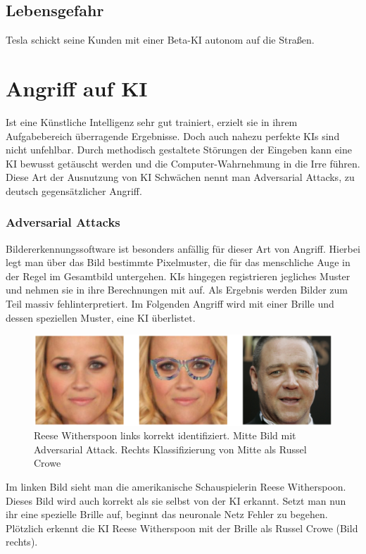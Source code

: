 \documentclass[12pt,oneside,a4paper,parskip]{scrbook}
\begin{document}
\subsection{Lebensgefahr}
Tesla schickt seine Kunden mit einer Beta-KI autonom auf die Straßen.
\section{Angriff auf KI}
Ist eine Künstliche Intelligenz sehr gut trainiert, erzielt sie in ihrem Aufgabebereich überragende Ergebnisse. Doch auch nahezu perfekte KIs sind nicht unfehlbar. Durch methodisch gestaltete Störungen der Eingeben kann eine KI bewusst getäuscht werden und die Computer-Wahrnehmung in die Irre führen. Diese Art der Ausnutzung von KI Schwächen nennt man Adversarial Attacks, zu deutsch gegensätzlicher Angriff.
\subsubsection{Adversarial Attacks}
Bildererkennungssoftware ist besonders anfällig für dieser Art von Angriff. Hierbei legt man über das Bild bestimmte Pixelmuster, die für das menschliche Auge in der Regel im Gesamtbild untergehen. KIs hingegen registrieren jegliches Muster und nehmen sie in ihre Berechnungen mit auf. Als Ergebnis werden Bilder zum Teil massiv fehlinterpretiert.
Im Folgenden Angriff wird mit einer Brille und dessen speziellen Muster, eine KI überlistet.
\label{section:BrilleAttack}
\begin{figure}[h]
	\begin{center}
		\includegraphics[width=15cm]{Bilder/Brille_Adversarial_Attack.png}
		\caption{Reese Witherspoon links korrekt identifiziert. Mitte Bild mit Adversarial Attack. Rechts Klassifizierung von Mitte als Russel Crowe}
		\label{fig:BrilleAttack}
	\end{center}
\end{figure}
Im linken Bild sieht man die amerikanische Schauspielerin Reese Witherspoon. Dieses Bild wird auch korrekt als sie selbst von der KI erkannt. Setzt man nun ihr eine spezielle Brille auf, beginnt das neuronale Netz Fehler zu begehen. Plötzlich erkennt die KI Reese Witherspoon mit der Brille als Russel Crowe (Bild rechts).
\end{document}
